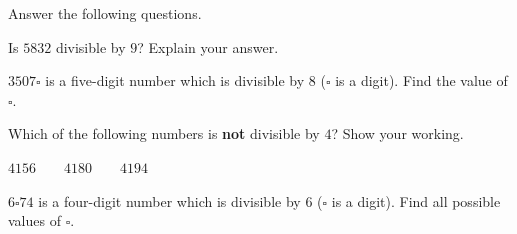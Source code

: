  Answer the following questions.

\begin{subparts}
  \item Is $5832$ divisible by $9$? Explain your answer.

  \item $3507\square$ is a five-digit number which is divisible by $8$ ($\square$ is a digit). Find the value of $\square$.

  \item Which of the following numbers is \textbf{not} divisible by $4$? Show your working.

  \noindent \hspace{5em} $4156 \qquad 4180 \qquad 4194$

  \item $6\square 74$ is a four-digit number which is divisible by $6$ ($\square$ is a digit). Find all possible values of $\square$.
\end{subparts}

